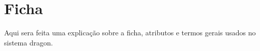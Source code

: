 


\chapter{Ficha}
\label{Cap:Ficha}

Aqui sera feita uma explicação sobre a ficha, atributos e termos gerais usados no sistema dragon.

